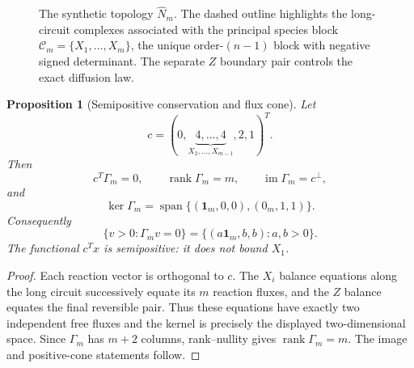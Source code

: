 \documentclass[11pt]{article}
\newtheorem{proposition}[theorem]{Proposition}
\theoremstyle{definition}
\newcommand{\im}{\operatorname{im}}
\newcommand{\rank}{\operatorname{rank}}
\newcommand{\1}{\mathbf 1}
\newcommand{\cC}{\mathcal C}
\begin{document}
\begin{figure}[t]
\centering

\caption{The synthetic topology $\widehat N_m$.  The dashed outline highlights
the long-circuit complexes associated with the principal species block
$\cC_m=\{X_1,\ldots,X_m\}$, the unique order-$(n-1)$ block with negative signed
determinant.  The separate $Z$ boundary pair controls the exact diffusion law.}
\label{fig:network}
\end{figure}

\begin{proposition}[Semipositive conservation and flux cone]\label{prop:flux}
Let
\begin{equation}\label{eq:cvec}
 c=(0,\underbrace{4,\ldots,4}_{X_2,\ldots,X_{m-1}},2,1)^T.
\end{equation}
Then
\begin{equation}\label{eq:rank-kernel}
 c^T\Gamma_m=0,\qquad \rank\Gamma_m=m,\qquad
 \im\Gamma_m=c^\perp,
\end{equation}
and
\begin{equation}\label{eq:kerGamma}
 \ker\Gamma_m=
 \operatorname{span}\{(\1_m,0,0),(0_m,1,1)\}.
\end{equation}
Consequently
\begin{equation}\label{eq:fluxcone}
 \{v>0:\Gamma_mv=0\}=\{(a\1_m,b,b):a,b>0\}.
\end{equation}
The functional $c^Tx$ is semipositive: it does not bound $X_1$.
\end{proposition}

\begin{proof}
Each reaction vector is orthogonal to $c$.  The $X_i$ balance equations along
the long circuit successively equate its $m$ reaction fluxes, and the $Z$
balance equates the final reversible pair.  Thus these equations have exactly
two independent free fluxes and the kernel is precisely the displayed
two-dimensional space.  Since $\Gamma_m$ has $m+2$ columns, rank--nullity gives
$\rank\Gamma_m=m$.  The image and positive-cone statements follow.
\end{proof}
\end{document}
